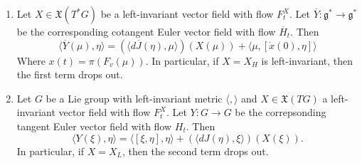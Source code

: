 \begin{thm}

\begin{enumerate}
    \item Let $X \in \mathfrak{X}(T^*G)$ be a left-invariant vector field with flow $F^X_t$. Let $\overline{Y}: \mathfrak{g}^* \to \mathfrak{g}^*$ be the corresponding cotangent Euler vector field with flow $\overline{H}_t$. Then 
    \begin{equation}    \langle \overline{Y}(\mu), \eta \rangle = ( \langle d \overline{J}(\eta), \mu \rangle ) (X(\mu)) + \langle \mu, [\dot{x}(0), \eta] \rangle\end{equation}
    Where $x(t) = \pi (F_v(\mu))$. In particular, if $X=X_H$ is left-invariant, then the first term drops out.
    
    \item Let $G$ be a Lie group with left-invariant metric $\langle, \rangle$ and $X \in \mathfrak{X}(TG)$ a left-invariant vector field with flow $F^X_t$. Let $Y: G \to G$ be the correpsonding tangent Euler vector field with flow $H_t$. Then 
    \begin{equation}\langle Y(\xi), \eta \rangle = \langle [\xi, \eta], \eta \rangle + (\langle d J(\eta), \xi \rangle )(X(\xi)).\end{equation}
    In particular, if $X=X_L$, then the second term drops out.
\end{enumerate}
\end{thm}


